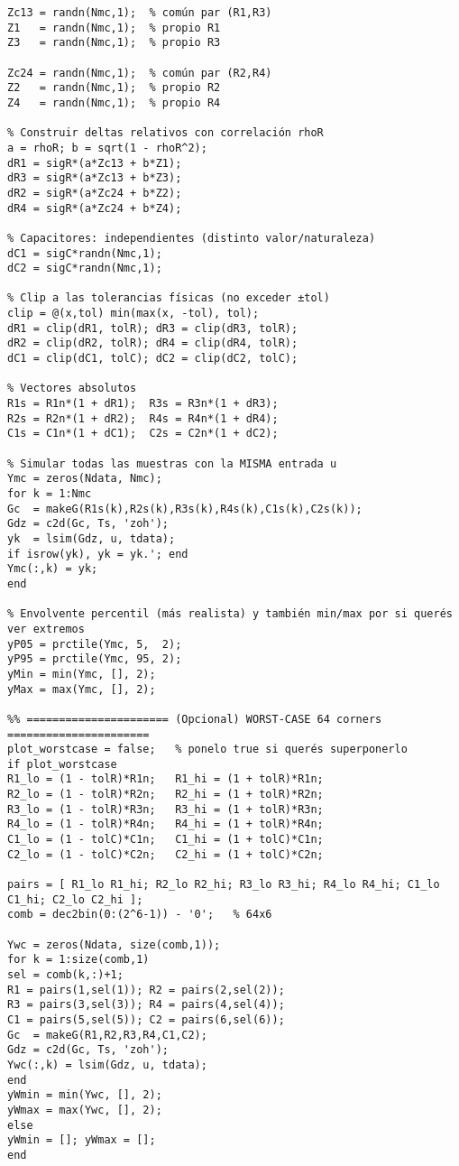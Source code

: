 \begin{lstlisting}[style=matlabstyle,caption={Script para la comparación de la planta en lazo abierto nominal vs mediciones.},label={matlab:openLoop}]
% Ruido normal correlacionado para (R1,R3) y (R2,R4)
Zc13 = randn(Nmc,1);  % común par (R1,R3)
Z1   = randn(Nmc,1);  % propio R1
Z3   = randn(Nmc,1);  % propio R3

Zc24 = randn(Nmc,1);  % común par (R2,R4)
Z2   = randn(Nmc,1);  % propio R2
Z4   = randn(Nmc,1);  % propio R4

% Construir deltas relativos con correlación rhoR
a = rhoR; b = sqrt(1 - rhoR^2);
dR1 = sigR*(a*Zc13 + b*Z1);
dR3 = sigR*(a*Zc13 + b*Z3);
dR2 = sigR*(a*Zc24 + b*Z2);
dR4 = sigR*(a*Zc24 + b*Z4);

% Capacitores: independientes (distinto valor/naturaleza)
dC1 = sigC*randn(Nmc,1);
dC2 = sigC*randn(Nmc,1);

% Clip a las tolerancias físicas (no exceder ±tol)
clip = @(x,tol) min(max(x, -tol), tol);
dR1 = clip(dR1, tolR); dR3 = clip(dR3, tolR);
dR2 = clip(dR2, tolR); dR4 = clip(dR4, tolR);
dC1 = clip(dC1, tolC); dC2 = clip(dC2, tolC);

% Vectores absolutos
R1s = R1n*(1 + dR1);  R3s = R3n*(1 + dR3);
R2s = R2n*(1 + dR2);  R4s = R4n*(1 + dR4);
C1s = C1n*(1 + dC1);  C2s = C2n*(1 + dC2);

% Simular todas las muestras con la MISMA entrada u
Ymc = zeros(Ndata, Nmc);
for k = 1:Nmc
Gc  = makeG(R1s(k),R2s(k),R3s(k),R4s(k),C1s(k),C2s(k));
Gdz = c2d(Gc, Ts, 'zoh');
yk  = lsim(Gdz, u, tdata);
if isrow(yk), yk = yk.'; end
Ymc(:,k) = yk;
end

% Envolvente percentil (más realista) y también min/max por si querés ver extremos
yP05 = prctile(Ymc, 5,  2);
yP95 = prctile(Ymc, 95, 2);
yMin = min(Ymc, [], 2);
yMax = max(Ymc, [], 2);

%% ====================== (Opcional) WORST-CASE 64 corners ======================
plot_worstcase = false;   % ponelo true si querés superponerlo
if plot_worstcase
R1_lo = (1 - tolR)*R1n;   R1_hi = (1 + tolR)*R1n;
R2_lo = (1 - tolR)*R2n;   R2_hi = (1 + tolR)*R2n;
R3_lo = (1 - tolR)*R3n;   R3_hi = (1 + tolR)*R3n;
R4_lo = (1 - tolR)*R4n;   R4_hi = (1 + tolR)*R4n;
C1_lo = (1 - tolC)*C1n;   C1_hi = (1 + tolC)*C1n;
C2_lo = (1 - tolC)*C2n;   C2_hi = (1 + tolC)*C2n;

pairs = [ R1_lo R1_hi; R2_lo R2_hi; R3_lo R3_hi; R4_lo R4_hi; C1_lo C1_hi; C2_lo C2_hi ];
comb = dec2bin(0:(2^6-1)) - '0';   % 64x6

Ywc = zeros(Ndata, size(comb,1));
for k = 1:size(comb,1)
sel = comb(k,:)+1;
R1 = pairs(1,sel(1)); R2 = pairs(2,sel(2));
R3 = pairs(3,sel(3)); R4 = pairs(4,sel(4));
C1 = pairs(5,sel(5)); C2 = pairs(6,sel(6));
Gc  = makeG(R1,R2,R3,R4,C1,C2);
Gdz = c2d(Gc, Ts, 'zoh');
Ywc(:,k) = lsim(Gdz, u, tdata);
end
yWmin = min(Ywc, [], 2);
yWmax = max(Ywc, [], 2);
else
yWmin = []; yWmax = [];
end


\end{lstlisting}
